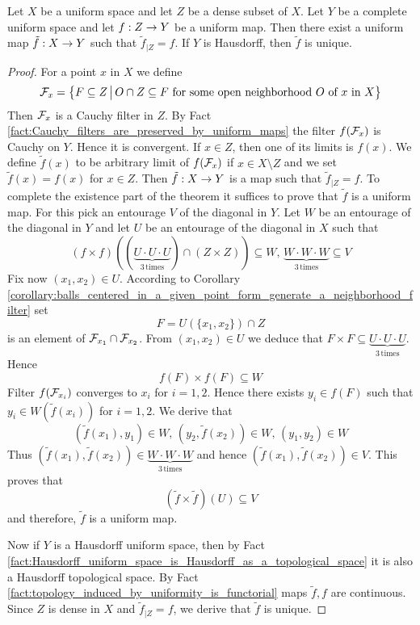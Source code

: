 \begin{theorem}\label{theorem:extension_of_densely_defined_uniform_maps_with_complete_target}
	Let $X$ be a uniform space and let $Z$ be a dense subset of $X$. Let $Y$ be a complete uniform space and let $f:Z\rightarrow Y$ be a uniform map. Then there exist a uniform map $\tilde{f}:X\rightarrow Y$ such that $\tilde{f}_{\mid Z} = f$. If $Y$ is Hausdorff, then $\tilde{f}$ is unique.
\end{theorem}
\begin{proof}
	For a point $x$ in $X$ we define
	$${\mathcal F}_x = \big\{F\subseteq Z\,\big|\,O\cap Z \subseteq F\mbox{ for some open neighborhood }O\mbox{ of }x\mbox{ in }X\big\}$$
	Then ${\mathcal F}_x$ is a Cauchy filter in $Z$. By Fact \ref{fact:Cauchy_filters_are_preserved_by_uniform_maps} the filter $f({\mathcal F}_x)$ is Cauchy on $Y$. Hence it is convergent. If $x \in Z$, then one of its limits is $f(x)$. We define $\tilde{f}(x)$ to be arbitrary limit of $f({\mathcal F}_x)$ if $x \in X\setminus Z$ and we set $\tilde{f}(x) = f(x)$ for $x \in Z$. Then $\tilde{f}:X\rightarrow Y$ is a map such that $\tilde{f}_{\mid Z} = f$. To complete the existence part of the theorem it suffices to prove that $\tilde{f}$ is a uniform map. For this pick an entourage $V$ of the diagonal in $Y$. Let $W$ be an entourage of the diagonal in $Y$ and let $U$ be an entourage of the diagonal in $X$ such that
	$$\left(f\times f\right)\left(\left(\underbrace{U\cdot U \cdot U}_{3\,\mathrm{times}}\right)\cap \left(Z\times Z\right)\right) \subseteq W,\,\underbrace{W\cdot W \cdot W}_{3\,\mathrm{times}} \subseteq V$$
	Fix now $(x_1,x_2) \in U$. According to Corollary \ref{corollary:balls_centered_in_a_given_point_form_generate_a_neighborhood_filter} set
	$$F = U\left(\{x_1,x_2\}\right)\cap Z$$
	is an element of ${\mathcal F}_{x_1}\cap {\mathcal F}_{x_2}$. From $(x_1,x_2) \in U$ we deduce that $F\times F \subseteq \underbrace{U\cdot U\cdot U}_{3\,\mathrm{times}}$. Hence
	$$f(F)\times f(F) \subseteq W$$
	Filter $f({\mathcal F}_{x_i})$ converges to $x_i$ for $i=1,2$. Hence there exists $y_i \in f(F)$ such that $y_i \in W\left(\tilde{f}(x_i)\right)$ for $i = 1, 2$. We derive that
	$$\left(\tilde{f}(x_1),y_1\right) \in W,\,\left(y_2,\tilde{f}(x_2)\right) \in W,\,(y_1,y_2) \in W$$
	Thus $\left(\tilde{f}(x_1),\tilde{f}(x_2)\right) \in \underbrace{W\cdot W\cdot W}_{3\,\mathrm{times}}$ and hence $\left(\tilde{f}(x_1),\tilde{f}(x_2)\right) \in V$. This proves that
	$$\left(\tilde{f}\times \tilde{f}\right)(U) \subseteq V$$
	and therefore, $\tilde{f}$ is a uniform map.

	Now if $Y$ is a Hausdorff uniform space, then by Fact \ref{fact:Hausdorff_uniform_space_is_Hausdorff_as_a_topological_space} it is also a Hausdorff topological space. By Fact \ref{fact:topology_induced_by_uniformity_is_functorial} maps $\tilde{f}, f$ are continuous. Since $Z$ is dense in $X$ and $\tilde{f}_{\mid Z} = f$, we derive that $\tilde{f}$ is unique.
\end{proof}

